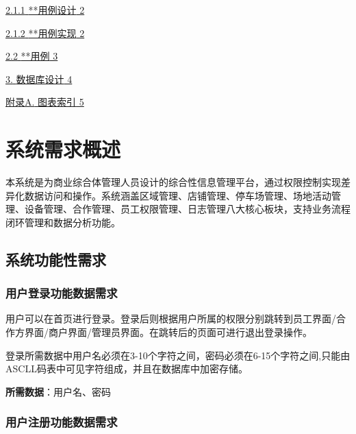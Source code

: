 \documentclass[]{article}
\begin{document}
\protect\hyperlink{ux7528ux6237ux7528ux4f8bux8bbeux8ba1}{{2.1.1}
{**用例设计} 2}

\protect\hyperlink{ux7528ux6237ux7528ux4f8bux5b9eux73b0}{{2.1.2}
{**用例实现} 2}

\protect\hyperlink{ux7528ux4f8b}{{2.2} {**用例} 3}

\protect\hyperlink{ux6570ux636eux5e93ux8bbeux8ba1}{{3.} {数据库设计} 4}

\protect\hyperlink{_Toc77076522}{{附录A.} {图表索引} 5}

\hypertarget{ux7cfbux7edfux9700ux6c42ux6982ux8ff0}{%
\section{系统需求概述}\label{ux7cfbux7edfux9700ux6c42ux6982ux8ff0}}

本系统是为商业综合体管理人员设计的综合性信息管理平台，通过权限控制实现差异化数据访问和操作。系统涵盖区域管理、店铺管理、停车场管理、场地活动管理、设备管理、合作管理、员工权限管理、日志管理八大核心板块，支持业务流程闭环管理和数据分析功能。

\hypertarget{ux7cfbux7edfux529fux80fdux6027ux9700ux6c42}{%
\subsection{系统功能性需求}\label{ux7cfbux7edfux529fux80fdux6027ux9700ux6c42}}

\hypertarget{ux7528ux6237ux767bux5f55ux529fux80fdux6570ux636eux9700ux6c42}{%
\subsubsection{用户登录功能数据需求}\label{ux7528ux6237ux767bux5f55ux529fux80fdux6570ux636eux9700ux6c42}}

用户可以在首页进行登录。登录后则根据用户所属的权限分别跳转到员工界面/合作方界面/商户界面/管理员界面。在跳转后的页面可进行退出登录操作。

登录所需数据中用户名必须在3-10个字符之间，密码必须在6-15个字符之间,只能由ASCLL码表中可见字符组成，并且在数据库中加密存储。

\textbf{所需数据}：用户名、密码

\hypertarget{ux7528ux6237ux6ce8ux518cux529fux80fdux6570ux636eux9700ux6c42}{%
\subsubsection{用户注册功能数据需求}\label{ux7528ux6237ux6ce8ux518cux529fux80fdux6570ux636eux9700ux6c42}}
\end{document}
